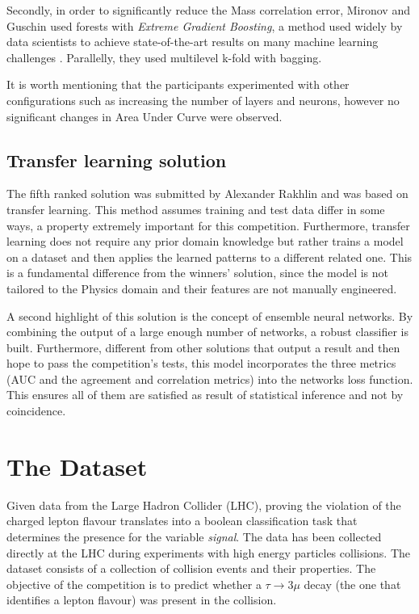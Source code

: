 \documentclass[conference]{IEEEtran}
\begin{document}
Secondly, in order to significantly reduce the Mass correlation error, Mironov and Guschin used forests with \textit{Extreme Gradient Boosting}, a method used widely by data scientists to achieve state-of-the-art results on many machine learning challenges \cite{chen2016xgboost}. Parallelly, they used multilevel k-fold with bagging.

It is worth mentioning that the participants experimented with other configurations such as increasing the number of layers and neurons, however no significant changes in Area Under Curve were observed.

\subsection{Transfer learning solution}
The fifth ranked solution was submitted by Alexander Rakhlin and was based on transfer learning. This method assumes training and test data differ in some ways, a property extremely important for this competition. Furthermore, transfer learning does not require any prior domain knowledge but rather trains a model on a dataset and then applies the learned patterns to a different related one. This is a fundamental difference from the winners' solution, since the model is not tailored to the Physics domain and their features are not manually engineered.

A second highlight of this solution is the concept of ensemble neural networks. By combining the output of a large enough number of networks, a robust classifier is built. Furthermore, different from other solutions that output a result and then hope to pass the competition's tests, this model incorporates the three metrics (AUC and the agreement and correlation metrics) into the networks loss function. This ensures all of them are satisfied as result of statistical inference and not by coincidence.

\section{The Dataset}
\label{sec:dataset}
Given data from the Large Hadron Collider (LHC), proving the violation of the charged lepton flavour translates into a boolean classification task that determines the presence for the variable \textit{signal}.  The data has been collected directly at the
LHC during experiments with high energy particles collisions. The dataset consists of a collection of collision events and their properties. The objective of the competition is to predict whether a $\tau \rightarrow 3\mu$ decay (the one that identifies a lepton flavour) was present in the collision.
\end{document}
